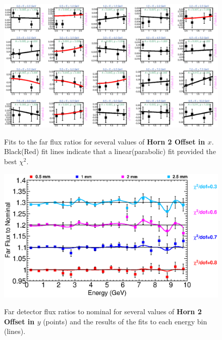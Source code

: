 \begin{figure}[ht]
  \begin{center}
    {\includegraphics[width=5.0in]{figures/Horn2XOffset_far_fits.eps}}
  \end{center}
\caption{ Fits to the far flux ratios for several values of {\bf Horn 2 Offset in $x$}. Black(Red) fit lines indicate that a linear(parabolic) fit provided the best $\chi^2$. }
\end{figure}

\begin{figure}[ht]
  \begin{center}
    {\includegraphics[width=6.0in]{figures/Horn2YOffset_far_summary.eps}}
  \end{center}
\caption{ Far detector flux ratios to nominal for several values of {\bf Horn 2 Offset in $y$} (points) and the results of the fits to each energy bin (lines).}
\end{figure}

